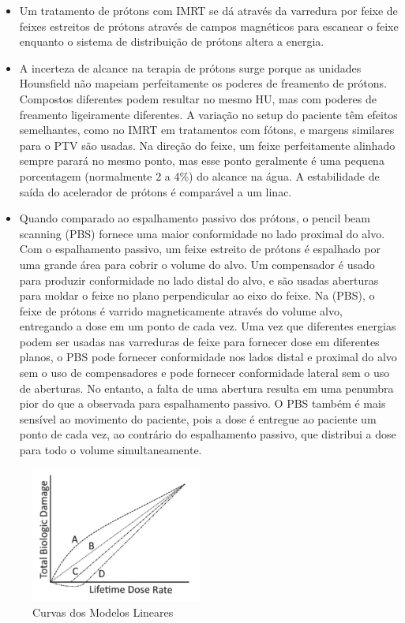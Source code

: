 \documentclass[11pt,a4paper]{article}
\newcounter{exemplo}
\begin{document}
\begin{exemplo}
\begin{itemize}
        \item Um tratamento de prótons com IMRT se dá através da varredura por feixe de feixes estreitos de prótons através de campos magnéticos para escanear o feixe enquanto o sistema de distribuição de prótons altera a energia.
        
        \item A incerteza de alcance na terapia de prótons surge porque as unidades Hounsfield não mapeiam perfeitamente os poderes de freamento de prótons. Compostos diferentes podem resultar no mesmo HU, mas com poderes de freamento ligeiramente diferentes. A variação no setup do paciente têm efeitos semelhantes, como no IMRT em tratamentos com fótons, e margens similares para o PTV  são usadas. Na direção do feixe, um feixe perfeitamente alinhado sempre parará no mesmo ponto, mas esse ponto geralmente é uma pequena porcentagem (normalmente 2 a 4\%) do alcance na água. A estabilidade de saída do acelerador de prótons é comparável a um linac.
        
        \item Quando comparado ao espalhamento passivo dos prótons, o pencil beam scanning (PBS) fornece uma maior conformidade no lado proximal do alvo. Com o espalhamento passivo, um feixe estreito de prótons é espalhado por uma grande área para cobrir o volume do alvo. Um compensador é usado para produzir conformidade no lado distal do alvo, e  são usadas aberturas para moldar o feixe no plano perpendicular ao eixo do feixe. Na (PBS), o feixe de prótons é varrido magneticamente através do volume alvo, entregando a dose em um ponto de cada vez. Uma vez que diferentes energias podem ser usadas nas varreduras de feixe para fornecer dose em diferentes planos, o PBS pode fornecer conformidade nos lados distal e proximal do alvo sem o uso de compensadores e pode fornecer conformidade lateral sem o uso de aberturas. No entanto, a falta de uma abertura resulta em uma penumbra pior do que a observada para espalhamento passivo. O PBS também é mais sensível ao movimento do paciente, pois a dose é entregue ao paciente um ponto de cada vez, ao contrário do espalhamento passivo, que distribui a dose para todo o volume simultaneamente.
    \end{itemize}
\end{exemplo}

\begin{figure}
    \centering
    \includegraphics[width=0.5\textwidth]{Imagens/modelosLineares.jpg}
    \caption{Curvas dos Modelos Lineares}
\end{figure}
\end{document}
